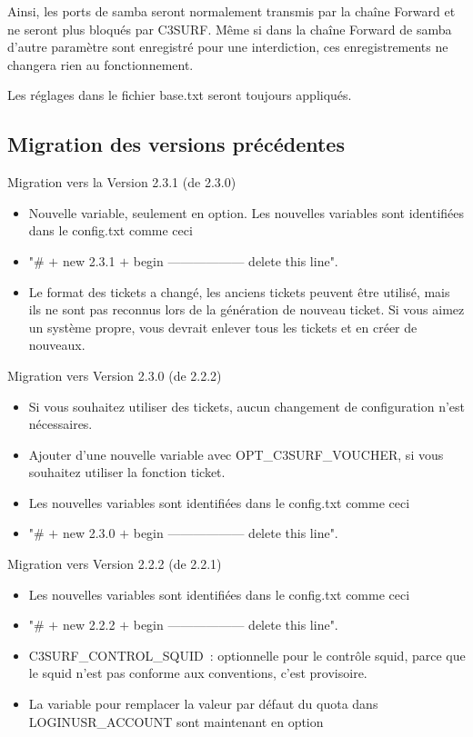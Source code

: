 \parskip 12pt

Ainsi, les ports de samba seront normalement transmis par la chaîne Forward
et ne seront plus bloqués par C3SURF. Même si dans la chaîne Forward de samba
d'autre paramètre sont enregistré pour une interdiction, ces enregistrements
ne changera rien au fonctionnement.

Les réglages dans le fichier base.txt seront toujours appliqués.

\subsection{Migration des versions précédentes}

\item Migration vers la Version 2.3.1 (de 2.3.0)
     \begin{itemize}
     \item Nouvelle variable, seulement en option. Les nouvelles variables sont
	  identifiées dans le config.txt comme ceci
     \item "\# $+$ new 2.3.1 $+$ begin ------------------ delete this line".
     \item Le format des tickets a changé, les anciens tickets peuvent être utilisé,
	 mais ils ne sont pas reconnus lors de la génération de nouveau ticket.
	 Si vous aimez un système propre, vous devrait enlever tous les tickets et
	 en créer de nouveaux.
     \end{itemize}

\item Migration vers Version 2.3.0 (de 2.2.2)
    \begin{itemize}
    \item Si vous souhaitez utiliser des tickets, aucun changement de configuration
    n'est nécessaires.
    \item Ajouter d'une  nouvelle variable avec OPT\_C3SURF\_VOUCHER, si vous souhaitez
    utiliser la fonction ticket.
    \item Les nouvelles variables sont identifiées dans le config.txt comme ceci
    \item "\# $+$ new 2.3.0 $+$ begin ------------------ delete this line".
\end{itemize}

\item Migration vers Version 2.2.2 (de 2.2.1)
    \begin{itemize}
    \item Les nouvelles variables sont identifiées dans le config.txt comme ceci
    \item "\# $+$ new 2.2.2 $+$ begin ------------------ delete this line".
    \item C3SURF\_CONTROL\_SQUID~: optionnelle pour le contrôle squid, parce que le squid
    n'est pas conforme aux conventions, c'est provisoire.
    \item La variable pour remplacer la valeur par défaut du quota dans LOGINUSR\_ACCOUNT
    sont maintenant en option
\end{itemize}

